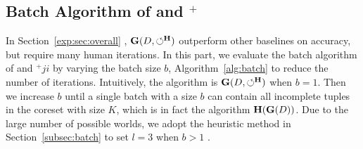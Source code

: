 
\subsection{Batch Algorithm of \ours and \ours$^+$}
\label{exp:sec:batchalgo}

In Section~\ref{exp:sec:overall} , $\mathbf{G}(D,\circlearrowleft^\mathbf{H})$  outperform other baselines on accuracy, but require many human iterations. In this part, we evaluate  the batch algorithm of \ours and \ours$^+ji$ by varying the batch size $b$, \ie Algorithm~\ref{alg:batch} to reduce the number of iterations. Intuitively, the algorithm is  $\mathbf{G}(D,\circlearrowleft^\mathbf{H})$  when $b=1$. 
Then we increase $b$ until a single batch with a size $b$ can contain all incomplete tuples in the coreset with size $K$, which is in fact the algorithm $\mathbf{H}(\mathbf{G}(D))$.
 Due to the large number of possible worlds, we adopt the heuristic method in Section~\ref{subsec:batch} to set $l=3$ when $b>1$ . 

